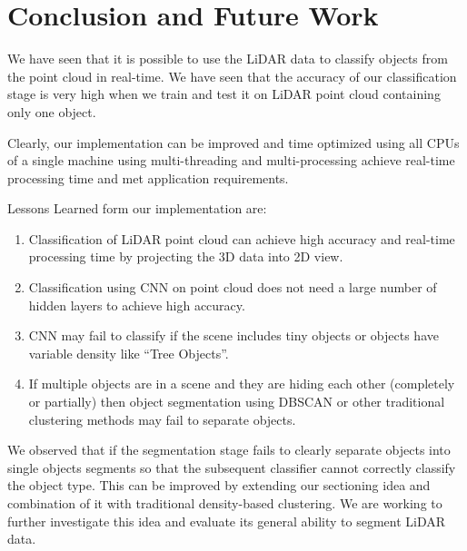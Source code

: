 \section{Conclusion and Future Work}\label{sec:conclusion}
We have seen that it is possible to use the LiDAR data to classify objects from the point cloud in real-time.
We have seen that the accuracy of our classification stage is very high when we train and test it on LiDAR point cloud containing only one object.


Clearly, our implementation can be improved and time optimized using all CPUs of a single machine using multi-threading and multi-processing achieve real-time processing time and met application requirements.


Lessons Learned form our implementation are:

\begin{enumerate}
  \item Classification of LiDAR point cloud can achieve high accuracy and real-time processing time by projecting the 3D data into 2D view.
  \item Classification using CNN on point cloud does not need a large number of hidden layers to achieve high accuracy.
  \item CNN may fail to classify if the scene includes tiny objects or objects have variable density like ``Tree Objects''.
  \item If multiple objects are in a scene and they are hiding each other (completely or partially) then object segmentation using DBSCAN or other traditional clustering methods may fail to separate objects.
\end{enumerate}

We observed that if the segmentation stage fails to clearly separate objects into single objects segments so that the subsequent classifier cannot correctly classify the object type. This can be improved by extending our sectioning idea and combination of it with traditional density-based clustering. We are working to further investigate this idea and evaluate its general ability to segment LiDAR data.  
